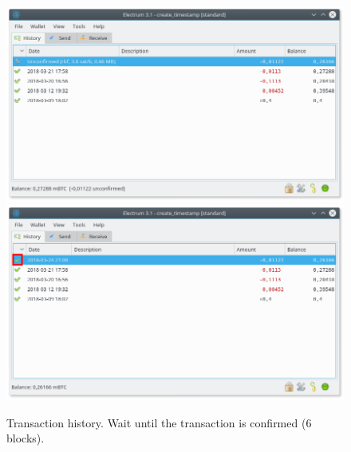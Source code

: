 \begin{figure}
	\begin{center}
		\includegraphics[width=\linewidth]{Images/tx-history.png}
		\includegraphics[width=\linewidth]{Images/tx-history-confirmed.png}
		\caption[Transaction history]{Transaction history. Wait until the transaction is confirmed (6 blocks).}
		\label{fig:tx-history}
	\end{center}
\end{figure} 

